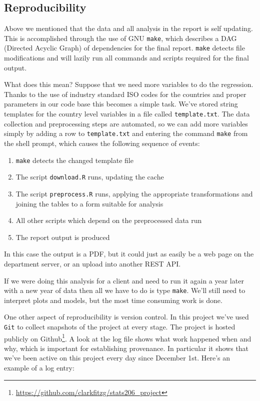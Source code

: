\documentclass[12pt]{article}
\begin{document}
\subsection{Reproducibility}

Above we mentioned that the data and all analysis in the report is self 
updating. This is accomplished through the use of GNU \texttt{make}, which
describes a DAG (Directed Acyclic Graph) of dependencies for the final
report. \texttt{make} detects file modifications and will lazily run all
commands and scripts required for the final output.

What does this mean? Suppose that we need more variables to do the
regression. Thanks to the use
of industry standard ISO codes for the countries and proper parameters in
our code base this becomes a simple task.
We've stored string templates for the country level 
variables in a file
called \texttt{template.txt}. The data collection and preprocessing steps
are automated, so we can add more variables simply by adding a row to
\texttt{template.txt} and entering the command \texttt{make} from the shell
prompt, which causes the following sequence of events: 

\begin{enumerate}
    \item \texttt{make} detects the changed template file
    \item The script \texttt{download.R} runs, updating the cache
    \item The script \texttt{preprocess.R} runs, applying the appropriate
        transformations and joining the tables to a form suitable for
        analysis
    \item All other scripts which depend on the preprocessed data run
    \item The report output is produced
\end{enumerate}

In this case the output is a PDF, but it could just as easily be a web page
on the department server, or an upload into another REST API.

If we were doing this analysis for a client and need to run it again a year
later with a new year of data 
then all we have to do is type \texttt{make}. We'll still need to interpret
plots and models, but the most time consuming work is done.

One other aspect of reproducibility is version control. In this
project we've used \texttt{Git} to collect snapshots of the project at
every stage. The project is hosted publicly on
Github\footnote{\url{https://github.com/clarkfitzg/stats206\_project}}.
A look at the log file shows what work happened when and why,
which is important for establishing provenance. In particular it shows 
that we've been active on this project every day since
December 1st. Here's an example of a log entry:
\end{document}

